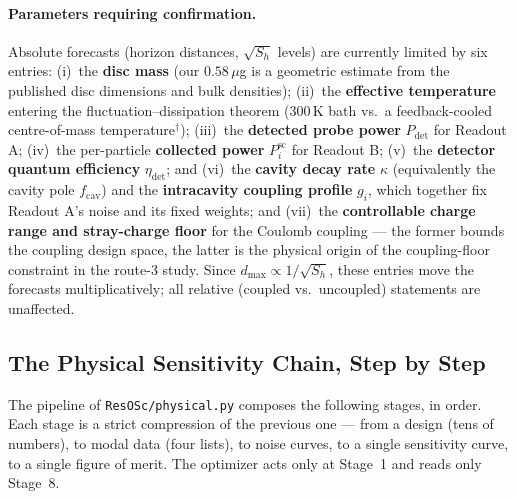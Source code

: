 \documentclass[11pt, letterpaper]{article}
\begin{document}
\paragraph{Parameters requiring confirmation.}  Absolute forecasts
(horizon distances, $\sqrt{S_h}$ levels) are currently limited by six
entries: (i)~the \textbf{disc mass} (our $0.58\,\mu$g is a geometric
estimate from the published disc dimensions and bulk densities);
(ii)~the \textbf{effective temperature} entering the
fluctuation--dissipation theorem (300\,K bath vs.\ a feedback-cooled
centre-of-mass temperature$^{\dag}$); (iii)~the \textbf{detected probe
power} $P_{\mathrm{det}}$ for Readout A; (iv)~the per-particle
\textbf{collected power} $P_i^{\mathrm{sc}}$ for Readout B; (v)~the
\textbf{detector quantum efficiency} $\eta_{\mathrm{det}}$; and
(vi)~the \textbf{cavity decay rate} $\kappa$ (equivalently the cavity
pole $f_{\mathrm{cav}}$) and the \textbf{intracavity coupling profile}
$g_i$, which together fix Readout A's noise and its fixed weights; and
(vii)~the \textbf{controllable charge range and stray-charge floor} for
the Coulomb coupling --- the former bounds the coupling design space,
the latter is the physical origin of the coupling-floor constraint in
the route-3 study.
Since $d_{\max} \propto 1/\sqrt{S_h}$, these entries move the forecasts
multiplicatively; all relative (coupled vs.\ uncoupled) statements are
unaffected.

\subsection{The Physical Sensitivity Chain, Step by Step}
\label{sec:chain}

The pipeline of \texttt{ResOSc/physical.py} composes the following
stages, in order.  Each stage is a strict compression of the previous
one --- from a design (tens of numbers), to modal data (four lists), to
noise curves, to a single sensitivity curve, to a single figure of
merit.  The optimizer acts only at Stage~1 and reads only Stage~8.
\end{document}
